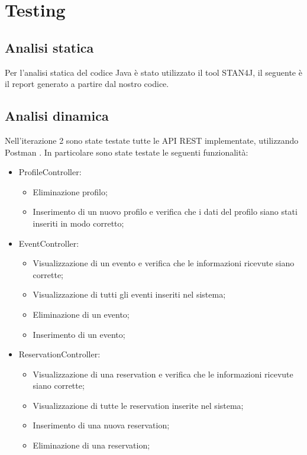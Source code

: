\section{Testing}
\subsection{Analisi statica}
Per l’analisi statica del codice Java è stato utilizzato il tool STAN4J, il seguente è il report generato a partire dal nostro codice.
\\


\subsection{Analisi dinamica}
Nell’iterazione 2 sono state testate tutte le API REST implementate, utilizzando Postman .
In particolare sono state testate le seguenti funzionalità:

\begin{itemize}
	\item ProfileController:
	\begin{itemize}
		\item Eliminazione profilo;
		\item Inserimento di un nuovo profilo e verifica che i dati del profilo siano stati inseriti in modo corretto;
	\end{itemize}
	\item EventController:
	\begin{itemize}
		\item Visualizzazione di un evento e verifica che le informazioni ricevute siano corrette;
		\item Visualizzazione di tutti gli eventi inseriti nel sistema;
		\item Eliminazione di un evento;
		\item Inserimento di un evento;
	\end{itemize}
	\item ReservationController:
	\begin{itemize}
		\item Visualizzazione di una reservation e verifica che le informazioni ricevute siano corrette;
		\item Visualizzazione di tutte le reservation inserite nel sistema;
		\item Inserimento di una nuova reservation;
		\item Eliminazione di una reservation;
	\end{itemize}

\end{itemize}

